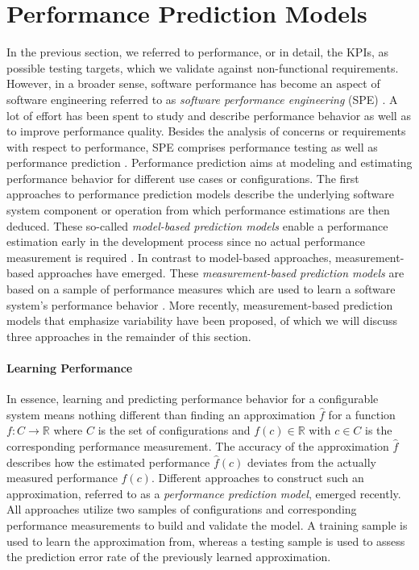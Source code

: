 \section{Performance Prediction
Models}\label{sec:performance_prediction_models} In the previous section, we referred to performance, or in detail, the KPIs, as
possible testing targets, which we validate against non-functional requirements.
However, in a broader sense, software performance has become an aspect of
software engineering referred to as \emph{software performance engineering}
(SPE) \citep{woodside_future_2007}.
A lot of effort has been spent to study and describe performance behavior as well
as to improve performance quality. Besides the analysis of concerns or
requirements with respect to performance, SPE comprises performance testing as
well as performance prediction \citep{woodside_future_2007}. Performance
prediction aims at modeling and estimating performance behavior for different
use cases or configurations. The first approaches to performance prediction
models describe the underlying software system component or operation from which
performance estimations are then deduced. These so-called \emph{model-based prediction models} enable a performance estimation early in the development process since no actual
performance measurement is required \citep{woodside_future_2007}. In contrast
to model-based approaches, measurement-based approaches have emerged. These \emph{measurement-based prediction models} are based on a sample of performance
measures which are used to learn a software system's performance behavior
\citep{woodside_future_2007}. More recently, measurement-based prediction models that emphasize variability have been
proposed, of which we will discuss three approaches in the remainder of
this section.

\paragraph{Learning Performance} In essence, learning and predicting
performance behavior for a configurable system means nothing different than finding an
approximation $\hat{f}$ for a function $f: C \rightarrow \mathbb{R}$ where $C$
is the set of configurations and $f(c) \in \mathbb{R}$ with $c \in C$ is the corresponding performance measurement. The
accuracy of the approximation $\hat{f}$ describes how the estimated performance
$\hat{f}(c)$ deviates from the actually measured performance $f(c)$. 
Different approaches to construct such an approximation, referred to as a
\emph{performance prediction model}, emerged recently. All approaches utilize
two samples of configurations and corresponding performance
measurements to build and validate the model. A training sample is used to
learn the approximation from, whereas a testing sample is used to assess the
prediction error rate of the previously learned approximation. 

